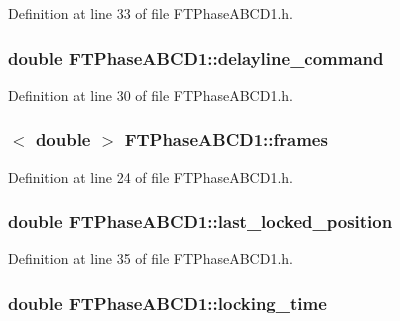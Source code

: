 Definition at line 33 of file FTPhaseABCD1.h.

\hypertarget{classFTPhaseABCD1_a9b071c0d2fa6c2392ad149d09d0e0f40}{
\subsubsection[{delayline\_\-command}]{\setlength{\rightskip}{0pt plus 5cm}double {\bf FTPhaseABCD1::delayline\_\-command}}}
\label{classFTPhaseABCD1_a9b071c0d2fa6c2392ad149d09d0e0f40}


Definition at line 30 of file FTPhaseABCD1.h.

\hypertarget{classFTPhaseABCD1_a1891f6e4f2a92991da6a1a3a0fc99fd4}{
\subsubsection[{frames}]{$<$ double $>$ {\bf FTPhaseABCD1::frames}}}
\label{classFTPhaseABCD1_a1891f6e4f2a92991da6a1a3a0fc99fd4}


Definition at line 24 of file FTPhaseABCD1.h.

\hypertarget{classFTPhaseABCD1_a7dcc8c733abc1e883df9f2e781b2fc93}{
\subsubsection[{last\_\-locked\_\-position}]{\setlength{\rightskip}{0pt plus 5cm}double {\bf FTPhaseABCD1::last\_\-locked\_\-position}}}
\label{classFTPhaseABCD1_a7dcc8c733abc1e883df9f2e781b2fc93}


Definition at line 35 of file FTPhaseABCD1.h.

\hypertarget{classFTPhaseABCD1_a622d98f54b96a5690a0f6b26cdf3bc78}{
\subsubsection[{locking\_\-time}]{\setlength{\rightskip}{0pt plus 5cm}double {\bf FTPhaseABCD1::locking\_\-time}}}
\label{classFTPhaseABCD1_a622d98f54b96a5690a0f6b26cdf3bc78}


